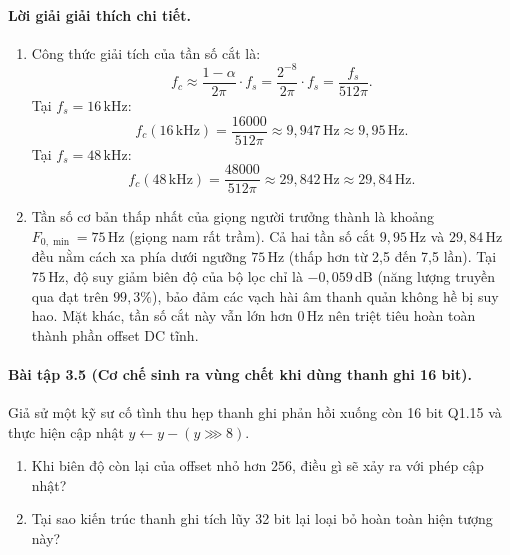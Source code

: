 \paragraph{Lời giải giải thích chi tiết.}
\begin{enumerate}[label=\alph*)]
    \item Công thức giải tích của tần số cắt là:
    \[
    f_c \approx \frac{1 - \alpha}{2\pi}\cdot f_s = \frac{2^{-8}}{2\pi}\cdot f_s = \frac{f_s}{512\pi}.
    \]
    Tại $f_s = 16\,\text{kHz}$:
    \[
    f_c(16\,\text{kHz}) = \frac{16000}{512\pi} \approx 9{,}947\,\text{Hz} \approx 9{,}95\,\text{Hz}.
    \]
    Tại $f_s = 48\,\text{kHz}$:
    \[
    f_c(48\,\text{kHz}) = \frac{48000}{512\pi} \approx 29{,}842\,\text{Hz} \approx 29{,}84\,\text{Hz}.
    \]
    \item Tần số cơ bản thấp nhất của giọng người trưởng thành là khoảng $F_{0,\min} = 75\,\text{Hz}$ (giọng nam rất trầm). Cả hai tần số cắt $9{,}95\,\text{Hz}$ và $29{,}84\,\text{Hz}$ đều nằm cách xa phía dưới ngưỡng $75\,\text{Hz}$ (thấp hơn từ 2,5 đến 7,5 lần). Tại $75\,\text{Hz}$, độ suy giảm biên độ của bộ lọc chỉ là $-0{,}059\,\text{dB}$ (năng lượng truyền qua đạt trên $99{,}3\%$), bảo đảm các vạch hài âm thanh quản không hề bị suy hao. Mặt khác, tần số cắt này vẫn lớn hơn $0\,\text{Hz}$ nên triệt tiêu hoàn toàn thành phần offset DC tĩnh.
\end{enumerate}

\paragraph{Bài tập 3.5 (Cơ chế sinh ra vùng chết khi dùng thanh ghi 16 bit).}
Giả sử một kỹ sư cố tình thu hẹp thanh ghi phản hồi xuống còn 16 bit Q1.15 và thực hiện cập nhật $y \leftarrow y - (y \ggg 8)$.
\begin{enumerate}[label=\alph*)]
    \item Khi biên độ còn lại của offset nhỏ hơn $256$, điều gì sẽ xảy ra với phép cập nhật?
    \item Tại sao kiến trúc thanh ghi tích lũy 32 bit lại loại bỏ hoàn toàn hiện tượng này?
\end{enumerate}

